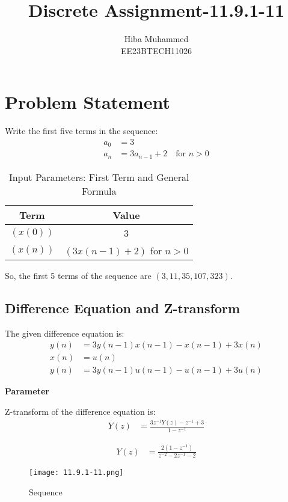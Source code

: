 \documentclass[12pt]{article}
\title{Discrete Assignment-11.9.1-11}
\author{Hiba Muhammed \\
        EE23BTECH11026}
\date{}
\newcommand{\brak}[1]{\left( #1 \right)}
\begin{document}
\maketitle

\section*{Problem Statement}
Write the first five terms in the sequence:
\begin{align}
a_{0}  &= 3 \\
a_{n}  &= 3a_{n-1} + 2 \quad \text{for } n > 0
\end{align}

\begin{table}[h]
  \centering
  \caption{Input Parameters: First Term and General Formula}
  \begin{tabular}{|c|c|}
    \hline
    \textbf{Term} & \textbf{Value} \\
    \hline
    $\brak{x(0)}$ & 3 \\
    $\brak{x(n)}$ & $\brak{3x(n-1) + 2}$ for $n > 0$ \\
    \hline
  \end{tabular}
\end{table}

So, the first 5 terms of the sequence are $\brak{3, 11, 35, 107, 323}$.


\subsection*{Difference Equation and Z-transform}

The given difference equation is:
\begin{align}
y(n) &= 3y(n-1)x(n-1) - x(n-1) + 3x(n) \\
x(n) &= u(n) \\
y(n) &= 3y(n-1)u(n-1) - u(n-1) + 3u(n)
\end{align}

\textbf{Parameter}

Z-transform of the difference equation is:
\begin{align}
Y(z) &= \frac{3z^{-1}Y(z) - z^{-1} + 3}{1 - z^{-1}}
\end{align}

\begin{align}
Y(z) &= \frac{2(1 - z^{-1})}{z^{-2} - 2z^{-1} - 2}
\end{align}

\begin{figure}[h]
    \centering
    \texttt{[image: 11.9.1-11.png]}
    \caption{Sequence}
\end{figure}
\end{document}
